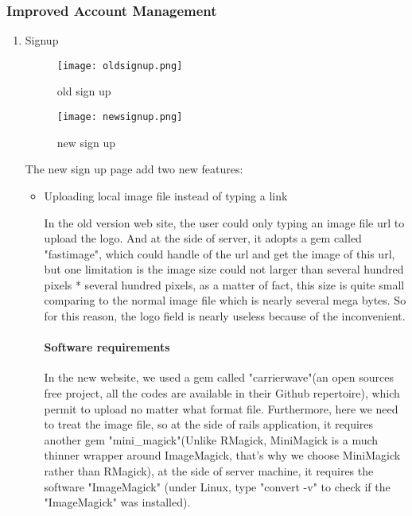 \subsubsection{Improved Account Management}
\begin{enumerate}
\item{Signup}
\begin{figure}[h!]
\centering
\texttt{[image: oldsignup.png]}
\caption{old sign up }
\label{fig-sample}
\end{figure}

\begin{figure}[h!]
\centering
\texttt{[image: newsignup.png]}
\caption{new sign up }
\label{fig-sample}
\end{figure}

The new sign up page add two new features:
\begin{itemize}
\item{Uploading local image file instead of typing a link}


In the old version web site, the user could only typing an image file url to upload the logo. And at the side of server, it adopts a gem called "fastimage", which could handle of the url and get the image of this url, but one limitation is the image size could not larger than several hundred pixels * several hundred pixels, as a matter of fact, this size is quite small comparing to the normal image file which is nearly several mega bytes. So for this reason, the logo field is nearly useless because of the inconvenient. 
\paragraph{Software requirements}
In the new website, we used a gem called "carrierwave"(an open sources free project, all the codes are available in their Github repertoire), which permit to upload no matter what format file. Furthermore, here we need to treat the image file, so at the side of rails application, it requires another gem "mini\_magick"(Unlike RMagick, MiniMagick is a much thinner wrapper around ImageMagick, that's why we choose MiniMagick rather than RMagick), at the side of server machine, it requires the software "ImageMagick" (under Linux, type "convert -v" to check if the "ImageMagick" was installed).

\end{itemize}
\end{enumerate}
